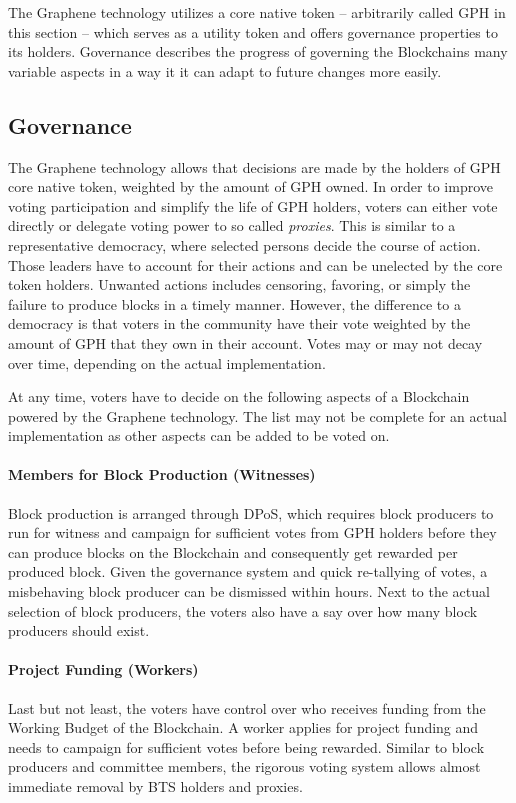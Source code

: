 The Graphene technology utilizes  a core native token -- arbitrarily called GPH in this section -- which serves as a utility token and offers governance properties to its holders. Governance describes the progress of governing the Blockchains many variable aspects in a way it it can adapt to future changes more easily.

\subsection{ Governance }
The Graphene technology allows that decisions are made by the holders of GPH core native token, weighted by the amount of GPH owned. In order to improve voting participation and simplify the life of GPH holders, voters can either vote directly or delegate voting power to so called \emph{proxies}. This is similar to a representative democracy, where selected persons decide the course of action. Those leaders have to account for their actions and can be unelected by the core token holders. Unwanted actions includes censoring, favoring, or simply the failure to produce blocks in a timely manner. However, the difference to a democracy is that voters in the community have their vote weighted by the amount of GPH that they own in their account. Votes may or may not decay over time, depending on the actual implementation.

At any time, voters have to decide on the following aspects of a Blockchain powered by the Graphene technology. The list may not be complete for an actual implementation as other aspects can be added to be voted on.

\paragraph{Members for Block Production (Witnesses) }
Block production is arranged through DPoS, which requires block producers to run for witness and campaign for sufficient votes from GPH holders before 
they can produce blocks on the Blockchain and consequently get rewarded per produced block. Given the governance system and quick re-tallying of votes, a 
misbehaving block producer can be dismissed within hours. Next to the actual selection of block producers, the voters also have a say over how many block 
producers should exist.

\paragraph{Project Funding (Workers) }
Last but not least, the voters have control over who receives funding from the Working Budget of the Blockchain. A worker applies for project funding and 
needs to campaign for sufficient votes before being rewarded. Similar to block producers and committee members, the rigorous voting system allows 
almost immediate removal by BTS holders and proxies.

